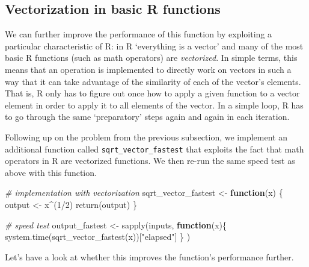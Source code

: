 \documentclass[
  12pt,
]{style/krantz}
\newenvironment{Shaded}{\begin{snugshade}}{\end{snugshade}}
\newcommand{\CommentTok}[1]{\textcolor[rgb]{0.56,0.35,0.01}{\textit{#1}}}
\newcommand{\ControlFlowTok}[1]{\textcolor[rgb]{0.13,0.29,0.53}{\textbf{#1}}}
\newcommand{\DecValTok}[1]{\textcolor[rgb]{0.00,0.00,0.81}{#1}}
\newcommand{\FunctionTok}[1]{\textcolor[rgb]{0.00,0.00,0.00}{#1}}
\newcommand{\NormalTok}[1]{#1}
\newcommand{\OtherTok}[1]{\textcolor[rgb]{0.56,0.35,0.01}{#1}}
\newcommand{\SpecialCharTok}[1]{\textcolor[rgb]{0.00,0.00,0.00}{#1}}
\newcommand{\StringTok}[1]{\textcolor[rgb]{0.31,0.60,0.02}{#1}}
\begin{document}
\hypertarget{vectorization-in-basic-r-functions}{%
\subsection{Vectorization in basic R functions}\label{vectorization-in-basic-r-functions}}

We can further improve the performance of this function by exploiting a particular characteristic of R: in R `everything is a vector' and many of the most basic R functions (such as math operators) are \emph{vectorized}. In simple terms, this means that an operation is implemented to directly work on vectors in such a way that it can take advantage of the similarity of each of the vector's elements. That is, R only has to figure out once how to apply a given function to a vector element in order to apply it to all elements of the vector. In a simple loop, R has to go through the same `preparatory' steps again and again in each iteration.

Following up on the problem from the previous subsection, we implement an additional function called \texttt{sqrt\_vector\_fastest} that exploits the fact that math operators in R are vectorized functions. We then re-run the same speed test as above with this function.

\begin{Shaded}
\begin{Highlighting}[]
\CommentTok{\# implementation with vectorization}
\NormalTok{sqrt\_vector\_fastest }\OtherTok{\textless{}{-}} 
     \ControlFlowTok{function}\NormalTok{(x) \{}
\NormalTok{               output }\OtherTok{\textless{}{-}}\NormalTok{  x}\SpecialCharTok{\^{}}\NormalTok{(}\DecValTok{1}\SpecialCharTok{/}\DecValTok{2}\NormalTok{)}
          \FunctionTok{return}\NormalTok{(output)}
\NormalTok{     \}}

\CommentTok{\# speed test}
\NormalTok{output\_fastest }\OtherTok{\textless{}{-}} 
     \FunctionTok{sapply}\NormalTok{(inputs, }
            \ControlFlowTok{function}\NormalTok{(x)\{ }\FunctionTok{system.time}\NormalTok{(}\FunctionTok{sqrt\_vector\_fastest}\NormalTok{(x))[}\StringTok{"elapsed"}\NormalTok{]}
\NormalTok{                 \}}
\NormalTok{            )}
\end{Highlighting}
\end{Shaded}

Let's have a look at whether this improves the function's performance further.
\end{document}
